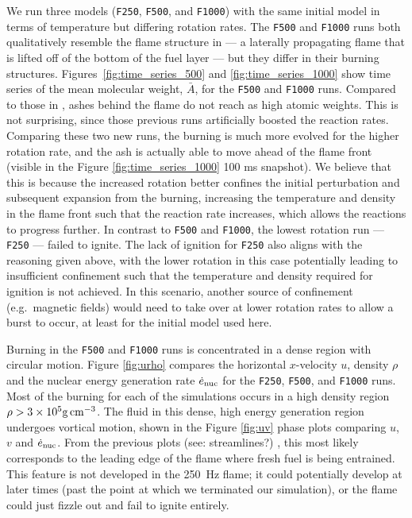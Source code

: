 \documentclass[preprint,times,tighten]{aastex63}
\newcommand{\MarginPar}[1]{
    \marginpar{\vskip-\baselineskip%
               \raggedright%
               \tiny\sffamily%
               {\color{red}\hrule%
               \smallskip%
               #1\par%
               \smallskip%
               \hrule}}%
}
\begin{document}
We run three models ({\tt F250}, {\tt F500}, and {\tt F1000}) with the same initial model in terms of temperature but differing rotation rates. The {\tt F500} and {\tt F1000} runs both qualitatively resemble the flame structure in \citet{flame_wave1} --- a laterally propagating flame that is lifted off of the bottom of the fuel layer --- but they differ in their burning structures. Figures~\ref{fig:time_series_500} and \ref{fig:time_series_1000} show time series of the mean molecular weight, $\bar{A}$, for the {\tt F500} and {\tt F1000} runs.  Compared to those in \cite{flame_wave1}, ashes behind the flame do not reach as high atomic weights. This is not surprising, since those previous runs artificially boosted the reaction rates.  Comparing these two new runs, the burning is much more evolved for the higher rotation rate, and the ash is actually able to move ahead of the flame front (visible in the Figure  \ref{fig:time_series_1000} 100 ms snapshot). We believe that this is because the increased rotation better confines the initial perturbation and subsequent expansion from the burning, increasing the temperature and density in the flame front such that the reaction rate increases, which allows the reactions to progress further. In contrast to {\tt F500} and {\tt F1000}, the lowest rotation run --- {\tt F250} --- failed to ignite. The lack of ignition for {\tt F250} also aligns with the reasoning given above, with the lower rotation in this case potentially leading to insufficient confinement such that the temperature and density required for ignition is not achieved. In this scenario, another source of confinement (e.g.\ magnetic fields) would need to take over at lower rotation rates to allow a burst to occur, at least for the initial model used here. 

Burning in the {\tt F500} and {\tt F1000} runs is concentrated in a dense region with circular motion. Figure \ref{fig:urho} compares the horizontal $x$-velocity $u$, density $\rho$ and the nuclear energy generation rate $\dot{e}_{\rm nuc}$ for the {\tt F250}, {\tt F500}, and {\tt F1000} runs. Most of the burning for each of the simulations occurs in a high density region $\rho > 3 \times 10^5 {\rm g\,cm^{-3}}$. The fluid in this dense, high energy generation region undergoes vortical motion, shown in the Figure \ref{fig:uv} phase plots comparing $u$, $v$ and $\dot{e}_{\rm nuc}$. From the previous plots (see: streamlines?) \MarginPar{NF: need to add streamline plots?}, this most likely corresponds to the leading edge of the flame where fresh fuel is being entrained. This feature is not developed in the 250~Hz flame; it could potentially develop at later times (past the point at which we terminated our simulation), or the flame could just fizzle out and fail to ignite entirely. 
\end{document}
